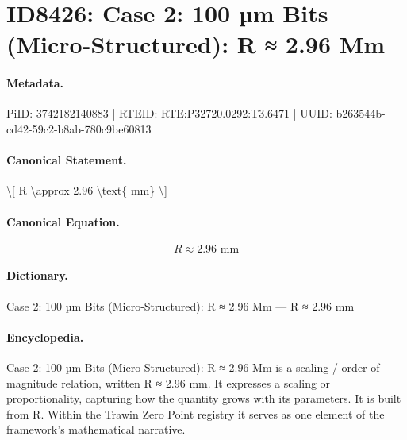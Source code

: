 \section*{ID8426: Case 2: 100 µm Bits (Micro-Structured): R ≈ 2.96 Mm}
\paragraph{Metadata.}
PiID: 3742182140883 | RTEID: RTE:P32720.0292:T3.6471 | UUID: b263544b-cd42-59c2-b8ab-780c9be60813

\paragraph{Canonical Statement.}
\textbackslash{}[ R \textbackslash{}approx 2.96 \textbackslash{}text\{ mm\} \textbackslash{}]

\paragraph{Canonical Equation.}
\[
R \approx 2.96 \text{ mm}
\]

\paragraph{Dictionary.}
Case 2: 100 µm Bits (Micro-Structured): R ≈ 2.96 Mm — R ≈ 2.96 mm

\paragraph{Encyclopedia.}
Case 2: 100 µm Bits (Micro-Structured): R ≈ 2.96 Mm is a scaling / order-of-magnitude relation, written R ≈ 2.96 mm. It expresses a scaling or proportionality, capturing how the quantity grows with its parameters. It is built from R. Within the Trawin Zero Point registry it serves as one element of the framework's mathematical narrative.
